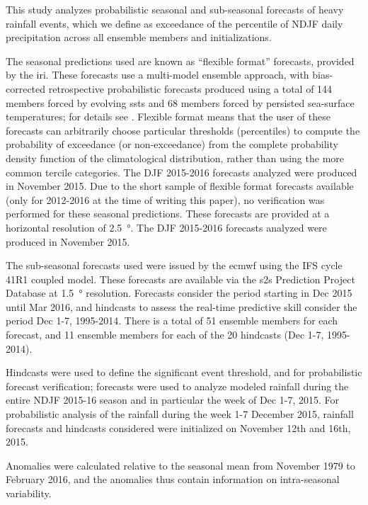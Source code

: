 \documentclass{ametsoc}
\begin{document}
This study analyzes probabilistic seasonal and sub-seasonal forecasts of heavy rainfall events, which we define as exceedance of the  percentile of NDJF daily precipitation across all ensemble members and initializations.

The seasonal predictions used  are known as ``flexible format'' forecasts, provided by the \gls{iri}.
These forecasts use a multi-model ensemble approach, with bias-corrected retrospective probabilistic forecasts produced using a total of 144 members forced by evolving \glspl{sst} and 68 members forced by persisted sea-surface temperatures; for details see \citet{Barnston2010}.
Flexible format means that the user of these forecasts can arbitrarily choose  particular thresholds (percentiles) to compute the  probability of exceedance (or non-exceedance) from the complete  probability density function of the climatological distribution,  rather than using the more common tercile categories.
The DJF 2015-2016 forecasts analyzed were produced in  November 2015.
Due to the short sample of flexible format forecasts available (only for 2012-2016 at the time of writing this paper), no verification was performed for these seasonal predictions.
These forecasts are provided at a horizontal  resolution of \SI{2.5}{\degree}.
The DJF 2015-2016 forecasts analyzed were produced in November 2015.

The sub-seasonal forecasts used were issued by the \gls{ecmwf} using the IFS cycle 41R1 coupled model.
These forecasts are available via the \gls{s2s} Prediction Project Database \citep{Vitart2016} at \SI{1.5}{\degree} resolution.
Forecasts consider the period starting in Dec 2015 until Mar 2016, and hindcasts to assess the real-time predictive skill consider the period Dec 1-7, 1995-2014.
There is a total of 51 ensemble members for each forecast, and 11 ensemble members for each of the 20 hindcasts (Dec 1-7, 1995-2014).

Hindcasts were used to define the significant event threshold, and for probabilistic forecast verification; forecasts were used to analyze modeled rainfall during the entire NDJF 2015-16 season and in particular the week of Dec 1-7, 2015.
For probabilistic analysis of the rainfall during the week 1-7 December 2015, rainfall forecasts and hindcasts considered were initialized on November 12th and 16th, 2015.

Anomalies were calculated relative to the seasonal mean from November 1979 to February 2016, and the anomalies thus contain information on intra-seasonal variability.
\end{document}

